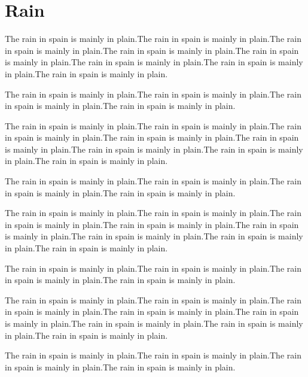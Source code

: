 \documentclass[a5]{book}
\begin{document}
\chapter{Rain}

\begin{figure}[b]
\end{figure}

The rain in spain is mainly in plain.The rain in spain is mainly in plain.The rain in spain is mainly in plain.The rain in spain is mainly in plain.The rain in spain is mainly in plain.The rain in spain is mainly in plain.The rain in spain is mainly in plain.The rain in spain is mainly in plain.

The rain in spain is mainly in plain.The rain in spain is mainly in plain.The rain in spain is mainly in plain.The rain in spain is mainly in plain.

The rain in spain is mainly in plain.The rain in spain is mainly in plain.The rain in spain is mainly in plain.The rain in spain is mainly in plain.The rain in spain is mainly in plain.The rain in spain is mainly in plain.The rain in spain is mainly in plain.The rain in spain is mainly in plain.

The rain in spain is mainly in plain.The rain in spain is mainly in plain.The rain in spain is mainly in plain.The rain in spain is mainly in plain.

The rain in spain is mainly in plain.The rain in spain is mainly in plain.The rain in spain is mainly in plain.The rain in spain is mainly in plain.The rain in spain is mainly in plain.The rain in spain is mainly in plain.The rain in spain is mainly in plain.The rain in spain is mainly in plain.

The rain in spain is mainly in plain.The rain in spain is mainly in plain.The rain in spain is mainly in plain.The rain in spain is mainly in plain.

The rain in spain is mainly in plain.The rain in spain is mainly in plain.The rain in spain is mainly in plain.The rain in spain is mainly in plain.The rain in spain is mainly in plain.The rain in spain is mainly in plain.The rain in spain is mainly in plain.The rain in spain is mainly in plain.

The rain in spain is mainly in plain.The rain in spain is mainly in plain.The rain in spain is mainly in plain.The rain in spain is mainly in plain.



\end{document}
